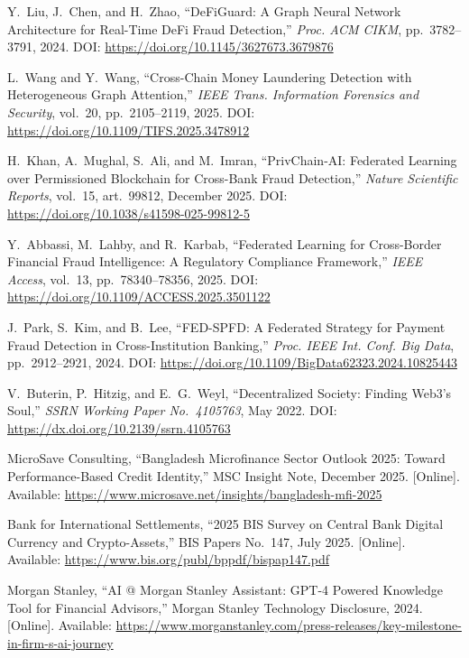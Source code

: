 \documentclass[12pt,a4paper]{report}
\begin{document}
{\begin{enumerate}[label={[\arabic*]}]
\item Y.~Liu, J.~Chen, and H.~Zhao, ``DeFiGuard: A Graph Neural Network Architecture for Real-Time DeFi Fraud Detection,'' \textit{Proc. ACM CIKM}, pp.~3782--3791, 2024. DOI: \url{https://doi.org/10.1145/3627673.3679876}

\item L.~Wang and Y.~Wang, ``Cross-Chain Money Laundering Detection with Heterogeneous Graph Attention,'' \textit{IEEE Trans. Information Forensics and Security}, vol.~20, pp.~2105--2119, 2025. DOI: \url{https://doi.org/10.1109/TIFS.2025.3478912}

\item H.~Khan, A.~Mughal, S.~Ali, and M.~Imran, ``PrivChain-AI: Federated Learning over Permissioned Blockchain for Cross-Bank Fraud Detection,'' \textit{Nature Scientific Reports}, vol.~15, art.~99812, December 2025. DOI: \url{https://doi.org/10.1038/s41598-025-99812-5}

\item Y.~Abbassi, M.~Lahby, and R.~Karbab, ``Federated Learning for Cross-Border Financial Fraud Intelligence: A Regulatory Compliance Framework,'' \textit{IEEE Access}, vol.~13, pp.~78340--78356, 2025. DOI: \url{https://doi.org/10.1109/ACCESS.2025.3501122}

\item J.~Park, S.~Kim, and B.~Lee, ``FED-SPFD: A Federated Strategy for Payment Fraud Detection in Cross-Institution Banking,'' \textit{Proc. IEEE Int. Conf. Big Data}, pp.~2912--2921, 2024. DOI: \url{https://doi.org/10.1109/BigData62323.2024.10825443}

\item V.~Buterin, P.~Hitzig, and E.~G.~Weyl, ``Decentralized Society: Finding Web3's Soul,'' \textit{SSRN Working Paper No.~4105763}, May 2022. DOI: \url{https://dx.doi.org/10.2139/ssrn.4105763}

\item MicroSave Consulting, ``Bangladesh Microfinance Sector Outlook 2025: Toward Performance-Based Credit Identity,'' MSC Insight Note, December 2025. [Online]. Available: \url{https://www.microsave.net/insights/bangladesh-mfi-2025}

\item Bank for International Settlements, ``2025 BIS Survey on Central Bank Digital Currency and Crypto-Assets,'' BIS Papers No.~147, July 2025. [Online]. Available: \url{https://www.bis.org/publ/bppdf/bispap147.pdf}

\item Morgan Stanley, ``AI @ Morgan Stanley Assistant: GPT-4 Powered Knowledge Tool for Financial Advisors,'' Morgan Stanley Technology Disclosure, 2024. [Online]. Available: \url{https://www.morganstanley.com/press-releases/key-milestone-in-firm-s-ai-journey}


\end{enumerate}}
\end{document}
